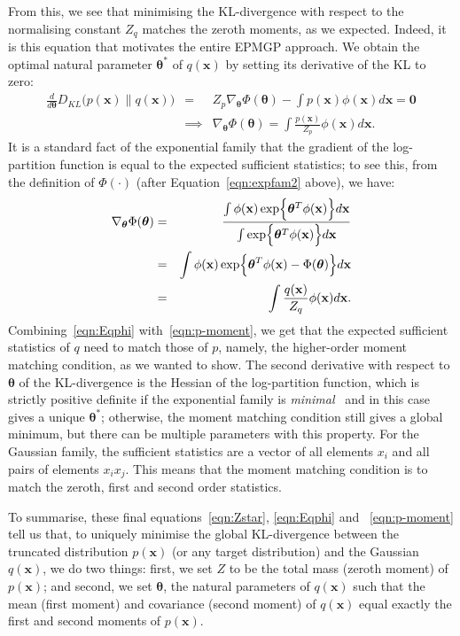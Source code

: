 \documentclass[twoside,11pt]{article}
\def\x{{\mathbf x}}
\def\boldtheta{\bm{\theta}}
\begin{document}
From this, we see that minimising the KL-divergence with respect to the normalising constant $Z_q$ matches the zeroth moments, as we expected.  Indeed, it is this equation that motivates the entire EPMGP approach. We obtain the optimal natural parameter $\boldtheta^*$ of $q(\x)$ by setting its derivative of the KL to zero:
%
\begin{eqnarray}
\label{eqn:dtheta}
\frac{d}{d\boldtheta}D_{KL}\bigl(p(\x) \parallel q(\x)\bigr)
& = & Z_p \nabla_{\boldtheta}\Phi(\boldtheta)- \int p(\x)\phi(\x)d\x = \mathbf{0} \\
& \implies & \nabla_{\boldtheta}\Phi(\boldtheta) = \int \frac{p(\x)}{Z_p}\phi(\x)d\x \label{eqn:p-moment}.
\end{eqnarray}
It is a standard fact of the exponential family that the gradient of the log-partition function is equal to the expected sufficient statistics; to see this, from the definition of $\Phi(\cdot)$ (after Equation~\ref{eqn:expfam2} above), we have:
%
\begin{eqnarray}
\label{eqn:dphi}
\nabla_{\boldtheta}\Phi(\boldtheta)
& = & \frac{\int\phi(\x)\exp\Bigl\{\boldtheta^T\phi(\x)\Bigr\}d\x}
{\int\exp\Bigl\{\boldtheta^T\phi(\x)\Bigr\}d\x} \\
& = & \int\phi(\x)\exp\Bigl\{\boldtheta^T\phi(\x) -
\Phi(\boldtheta)\Bigr\}d\x \\ \label{eqn:Eqphi}
& = & \int \frac{q(\x)}{Z_q}\phi(\x)d\x.
\end{eqnarray}
Combining~\eqref{eqn:Eqphi} with~\eqref{eqn:p-moment}, we get that the expected sufficient statistics of $q$ need to match those of $p$, namely, the higher-order moment matching condition, as we wanted to show. The second derivative with respect to $\boldtheta$ of the KL-divergence is the Hessian of the log-partition function, which is strictly positive definite if the exponential family is \emph{minimal}~\cite[]{wainwright08variational} and in this case gives a unique $\boldtheta^*$; otherwise, the moment matching condition still gives a global minimum, but there can be multiple parameters with this property.  For the Gaussian family, the sufficient statistics are a vector of all elements $x_i$ and all pairs of elements $x_i x_j$. This means that the moment matching condition is to match the zeroth, first and second order statistics.

To summarise, these final equations~\eqref{eqn:Zstar}, \eqref{eqn:Eqphi} and ~\eqref{eqn:p-moment} tell us that, to uniquely minimise the global KL-divergence between the truncated distribution $p(\x)$ (or any target distribution) and the Gaussian $q(\x)$, we do two things: first, we set $Z$ to be the total mass (zeroth moment) of $p(\x)$; and second, we set $\boldtheta$, the natural parameters of $q(\x)$ such that the mean (first moment) and covariance (second moment) of $q(\x)$ equal exactly the first and second moments of $p(\x)$. 
\end{document}
